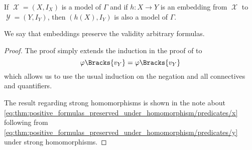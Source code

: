 \begin{proposition}\label{thm:arbitrary_formulas_preserved_under_isomorphisms}
  If \( \mscrX = (X, I_X) \) is a model of \( \Gamma \) and if \( h: X \to Y \) is an embedding from \( \mscrX \) to \( \mscrY = (Y, I_Y) \), then \( (h(X), I_Y) \) is also a model of \( \Gamma \).
\end{proposition}
\begin{comments}
  \item We say that embeddings preserve the validity arbitrary formulas.
\end{comments}
\begin{proof}
  The proof simply extends the induction in the proof of  to
  \begin{equation*}
    \varphi\Bracks{v_Y} = \varphi\Bracks{v_Y}
  \end{equation*}
  which allows us to use the usual induction on the negation and all connectives and quantifiers.

  The result regarding strong homomorphisms is shown in the note about \eqref{eq:thm:positive_formulas_preserved_under_homomorphism/predicates/x} following from \eqref{eq:thm:positive_formulas_preserved_under_homomorphism/predicates/y} under strong homomorphisms.
\end{proof}

